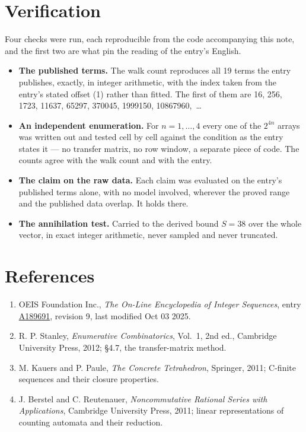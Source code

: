 \documentclass[11pt]{article}
\theoremstyle{definition}
\begin{document}
\section{Verification}

Four checks were run, each reproducible from the code accompanying this note, and the first two are what pin the reading of the entry's English.

\begin{itemize}

\item {\bfseries The published terms.} The walk count reproduces all 19 terms the entry publishes, exactly, in integer arithmetic, with the index taken from the entry's stated offset (1) rather than fitted. The first of them are 16, 256, 1723, 11637, 65297, 370045, 1999150, 10867960,~\dots

\item {\bfseries An independent enumeration.} For $n = 1,\dots,4$ every one of the $2^{4n}$ arrays was written out and tested cell by cell against the condition as the entry states it --- no transfer matrix, no row window, a separate piece of code. The counts agree with the walk count and with the entry.

\item {\bfseries The claim on the raw data.} Each claim was evaluated on the entry's published terms alone, with no model involved, wherever the proved range and the published data overlap. It holds there.

\item {\bfseries The annihilation test.} Carried to the derived bound $S = 38$ over the whole vector, in exact integer arithmetic, never sampled and never truncated.

\end{itemize}

\section{References}

\begin{enumerate}

\item OEIS Foundation Inc., \emph{The On-Line Encyclopedia of Integer Sequences}, entry \href{https://oeis.org/A189691}{A189691}, revision 9, last modified Oct 03 2025.

\item R. P. Stanley, \emph{Enumerative Combinatorics}, Vol.~1, 2nd ed., Cambridge University Press, 2012; \S4.7, the transfer-matrix method.

\item M. Kauers and P. Paule, \emph{The Concrete Tetrahedron}, Springer, 2011; C-finite sequences and their closure properties.

\item J. Berstel and C. Reutenauer, \emph{Noncommutative Rational Series with Applications}, Cambridge University Press, 2011; linear representations of counting automata and their reduction.

\end{enumerate}
\end{document}
